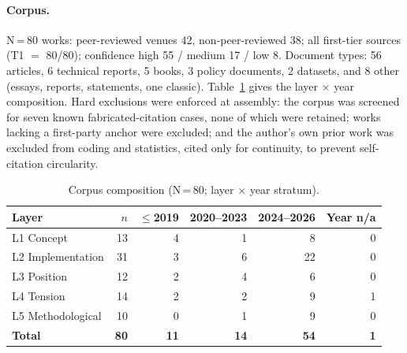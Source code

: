 \documentclass[10pt]{article}
\begin{document}
\paragraph{Corpus.}
N\,=\,80 works: peer-reviewed venues 42, non-peer-reviewed 38; all first-tier sources (T1 $=$ 80/80); confidence high 55 / medium 17 / low 8. Document types: 56 articles, 6 technical reports, 5 books, 3 policy documents, 2 datasets, and 8 other (essays, reports, statements, one classic). Table~\ref{tab:composition} gives the layer $\times$ year composition. Hard exclusions were enforced at assembly: the corpus was screened for seven known fabricated-citation cases, none of which were retained; works lacking a first-party anchor were excluded; and the author's own prior work was excluded from coding and statistics, cited only for continuity, to prevent self-citation circularity.

\begin{table}[t]
\centering
\caption{Corpus composition (N\,=\,80; layer $\times$ year stratum).}
\label{tab:composition}
\begin{tabular}{lrrrrr}
\toprule
Layer & $n$ & $\leq$2019 & 2020--2023 & 2024--2026 & Year n/a \\
\midrule
L1 Concept          & 13 & 4 & 1 & 8  & 0 \\
L2 Implementation   & 31 & 3 & 6 & 22 & 0 \\
L3 Position         & 12 & 2 & 4 & 6  & 0 \\
L4 Tension          & 14 & 2 & 2 & 9  & 1 \\
L5 Methodological   & 10 & 0 & 1 & 9  & 0 \\
\midrule
\textbf{Total}      & \textbf{80} & \textbf{11} & \textbf{14} & \textbf{54} & \textbf{1} \\
\bottomrule
\end{tabular}
\end{table}
\end{document}
